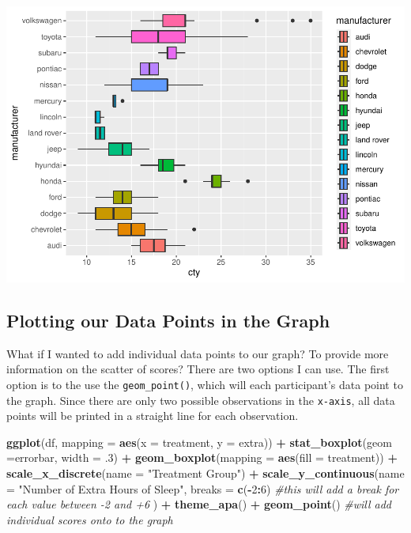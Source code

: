 \documentclass[
]{book}
\newenvironment{Shaded}{\begin{snugshade}}{\end{snugshade}}
\newcommand{\AttributeTok}[1]{\textcolor[rgb]{0.13,0.29,0.53}{#1}}
\newcommand{\CommentTok}[1]{\textcolor[rgb]{0.56,0.35,0.01}{\textit{#1}}}
\newcommand{\DecValTok}[1]{\textcolor[rgb]{0.00,0.00,0.81}{#1}}
\newcommand{\FunctionTok}[1]{\textcolor[rgb]{0.13,0.29,0.53}{\textbf{#1}}}
\newcommand{\NormalTok}[1]{#1}
\newcommand{\SpecialCharTok}[1]{\textcolor[rgb]{0.81,0.36,0.00}{\textbf{#1}}}
\newcommand{\StringTok}[1]{\textcolor[rgb]{0.31,0.60,0.02}{#1}}
\begin{document}
\includegraphics{rintro_demo_files/figure-latex/unnamed-chunk-299-2.pdf}

\hypertarget{plotting-our-data-points-in-the-graph}{%
\subsection{Plotting our Data Points in the Graph}\label{plotting-our-data-points-in-the-graph}}

What if I wanted to add individual data points to our graph? To provide more information on the scatter of scores? There are two options I can use. The first option is to the use the \texttt{geom\_point()}, which will each participant's data point to the graph. Since there are only two possible observations in the \texttt{x-axis}, all data points will be printed in a straight line for each observation.

\begin{Shaded}
\begin{Highlighting}[]
\FunctionTok{ggplot}\NormalTok{(df, }\AttributeTok{mapping =} \FunctionTok{aes}\NormalTok{(}\AttributeTok{x =}\NormalTok{ treatment, }\AttributeTok{y =}\NormalTok{ extra)) }\SpecialCharTok{+} 
  \FunctionTok{stat\_boxplot}\NormalTok{(}\AttributeTok{geom =}\StringTok{\textquotesingle{}errorbar\textquotesingle{}}\NormalTok{, }\AttributeTok{width =}\NormalTok{ .}\DecValTok{3}\NormalTok{) }\SpecialCharTok{+}
  \FunctionTok{geom\_boxplot}\NormalTok{(}\AttributeTok{mapping =} \FunctionTok{aes}\NormalTok{(}\AttributeTok{fill =}\NormalTok{ treatment)) }\SpecialCharTok{+} 
  \FunctionTok{scale\_x\_discrete}\NormalTok{(}\AttributeTok{name =} \StringTok{"Treatment Group"}\NormalTok{) }\SpecialCharTok{+} 
  \FunctionTok{scale\_y\_continuous}\NormalTok{(}\AttributeTok{name =} \StringTok{"Number of Extra Hours of Sleep"}\NormalTok{, }
                     \AttributeTok{breaks =} \FunctionTok{c}\NormalTok{(}\SpecialCharTok{{-}}\DecValTok{2}\SpecialCharTok{:}\DecValTok{6}\NormalTok{) }\CommentTok{\#this will add a break for each value between {-}2 and +6}
\NormalTok{                     ) }\SpecialCharTok{+}
  \FunctionTok{theme\_apa}\NormalTok{() }\SpecialCharTok{+}
  \FunctionTok{geom\_point}\NormalTok{() }\CommentTok{\#will add individual scores onto to the graph}
\end{Highlighting}
\end{Shaded}
\end{document}

